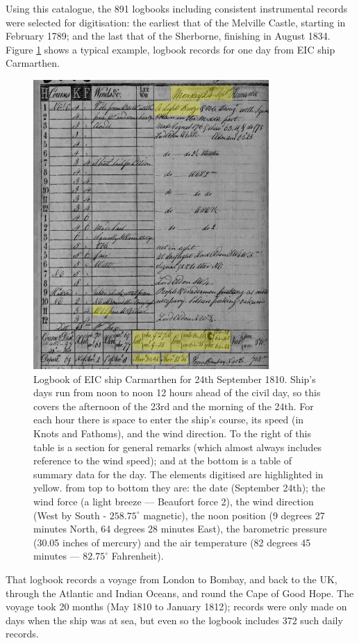 \documentclass[CP]{copernicus}
\begin{document}
Using this catalogue, the 891 logbooks including consistent instrumental records were selected for digitisation: the earliest that of the Melville Castle, starting in February 1789; and the last that of the Sherborne, finishing in August 1834. Figure \ref{Ftl1} shows a typical example, logbook records for one day from EIC ship Carmarthen.
\begin{figure}[!hbp]
\begin{center}
\includegraphics[angle=0, width=0.8\textwidth]{../figures/logbook_Carmarthen_Sept_24_1810+highlights}
\caption{Logbook of EIC ship Carmarthen for 24th September 1810. Ship's days run from noon to noon 12 hours ahead of the civil day, so this covers the afternoon of the 23rd and the morning of the 24th. For each hour there is space to enter the ship's course, its speed (in Knots and Fathoms), and the wind direction. To the right of this table is a section for general remarks (which almost always includes reference to the wind speed); and at the bottom is a table of summary data for the day. The elements digitised are highlighted in yellow. from top to bottom they are: the date (September 24th); the wind force (a light breeze --- Beaufort force 2), the wind direction (West by South - $258.75^\circ$ magnetic), the noon position (9 degrees 27 minutes North, 64 degrees 28 minutes East), the barometric pressure (30.05 inches of mercury) and the air temperature (82 degrees 45 minutes --- $82.75^\circ$ Fahrenheit).}
\label{Ftl1}
\end{center}
\end{figure}
That logbook records a voyage from London to Bombay, and back to the UK, through the Atlantic and Indian Oceans, and round the Cape of Good Hope. The voyage took 20 months (May 1810 to January 1812); records were only made on days when the ship was at sea, but even so the logbook includes 372 such daily records.
\end{document}
